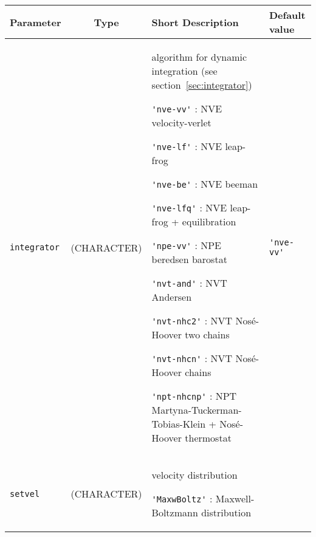 \documentclass[a4paper]{article}
\begin{document}
\begin{longtable}{l|c|m{8cm}|m{2cm}}
\hline
\hline
Parameter        &  Type              &          Short Description                                                          & Default value \\
\hline
\hline
\rule[-0.75cm]{0cm}{1.5cm}
\verb?integrator?    & (CHARACTER)    &  \newline algorithm for dynamic integration (see section~\ref{sec:integrator}) \newline                   

                                         \verb?'nve-vv'?    : NVE velocity-verlet \newline
					  
					 \verb?'nve-lf'?    : NVE leap-frog \newline
					   
				         \verb?'nve-be'?    : NVE beeman \newline

					 \verb?'nve-lfq'?   : NVE leap-frog +  equilibration \newline                        

					 \verb?'npe-vv'?    : NPE beredsen barostat \newline                        
					 
					 \verb?'nvt-and'?   : NVT Andersen \newline
					 
					 \verb?'nvt-nhc2'?  : NVT Nosé-Hoover two chains \newline

					 \verb?'nvt-nhcn'?  : NVT Nosé-Hoover chains \newline

					 \verb?'npt-nhcnp'? : NPT Martyna-Tuckerman-Tobias-Klein + Nosé-Hoover thermostat \newline & \verb?'nve-vv'? \tabularnewline
					 
\hline
\rule[-0.75cm]{0cm}{1.5cm}
\verb?setvel?        & (CHARACTER)    &  \newline velocity distribution \newline 
                                        
					 \verb?'MaxwBoltz'? : Maxwell-Boltzmann distribution \newline 


\end{longtable}
\end{document}
